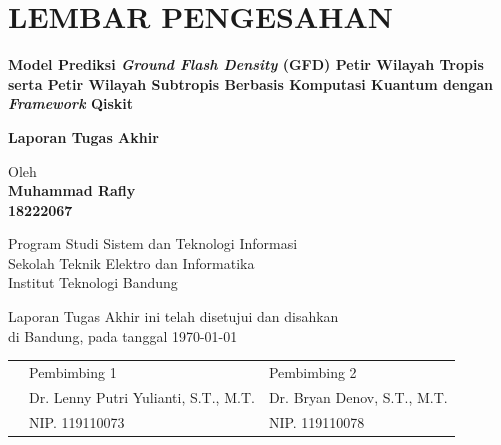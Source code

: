 \chapter*{LEMBAR PENGESAHAN}


\begin{center}
    \vspace{2cm}
  {\large\bfseries Model Prediksi \textit{Ground Flash Density} (GFD) Petir Wilayah Tropis serta Petir Wilayah Subtropis Berbasis Komputasi Kuantum dengan \textit{Framework} Qiskit}\\
     \vspace{2cm}

  {\Large \textbf{Laporan Tugas Akhir}}\\


  \vspace{1.5cm}
    
    
  {\large Oleh}\\[0.3cm]
    \textbf{
    {\large Muhammad Rafly}\\
    {\large 18222067}
  }\\
    
  \vspace{0.5cm}
 
  {\large Program Studi Sistem dan Teknologi Informasi}\\
  {\large Sekolah Teknik Elektro dan Informatika}\\
  {\large Institut Teknologi Bandung}\\

  \vspace{1.5cm}

  Laporan Tugas Akhir ini telah disetujui dan disahkan\\ 
  di Bandung, pada tanggal \today\\[1cm]

\end{center}

\vspace{1cm}
\noindent

\begin{tabular}{p{1cm}p{7cm}p{7cm}}
  & Pembimbing 1 & Pembimbing 2 \\[3cm]
  & Dr. Lenny Putri Yulianti, S.T., M.T. & Dr. Bryan Denov, S.T., M.T. \\[0.2cm]
  & NIP. 119110073 & NIP. 119110078
\end{tabular}

